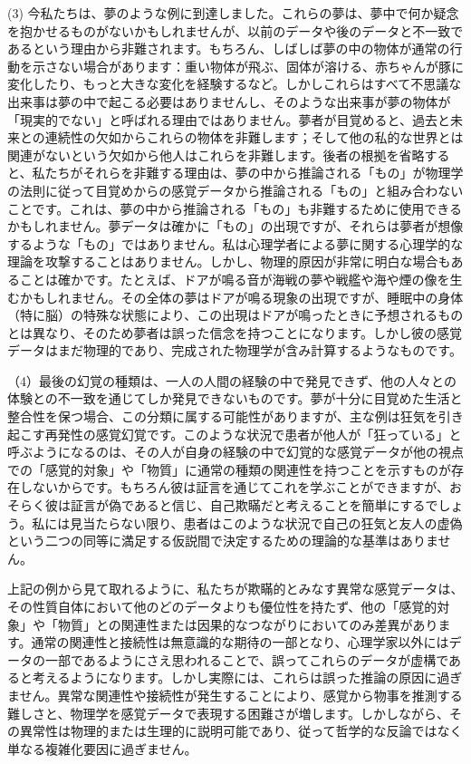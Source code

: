 \documentclass[a4paper,11pt,openany]{ltjsbook}
\begin{document}
(3) 今私たちは、夢のような例に到達しました。これらの夢は、夢中で何か疑念を抱かせるものがないかもしれませんが、以前のデータや後のデータと不一致であるという理由から非難されます。もちろん、しばしば夢の中の物体が通常の行動を示さない場合があります：重い物体が飛ぶ、固体が溶ける、赤ちゃんが豚に変化したり、もっと大きな変化を経験するなど。しかしこれらはすべて不思議な出来事は夢の中で起こる必要はありませんし、そのような出来事が夢の物体が「現実的でない」と呼ばれる理由ではありません。夢者が目覚めると、過去と未来との連続性の欠如からこれらの物体を非難します；そして他の私的な世界とは関連がないという欠如から他人はこれらを非難します。後者の根拠を省略すると、私たちがそれらを非難する理由は、夢の中から推論される「もの」が物理学の法則に従って目覚めからの感覚データから推論される「もの」と組み合わないことです。これは、夢の中から推論される「もの」も非難するために使用できるかもしれません。夢データは確かに「もの」の出現ですが、それらは夢者が想像するような「もの」ではありません。私は心理学者による夢に関する心理学的な理論を攻撃することはありません。しかし、物理的原因が非常に明白な場合もあることは確かです。たとえば、ドアが鳴る音が海戦の夢や戦艦や海や煙の像を生むかもしれません。その全体の夢はドアが鳴る現象の出現ですが、睡眠中の身体（特に脳）の特殊な状態により、この出現はドアが鳴ったときに予想されるものとは異なり、そのため夢者は誤った信念を持つことになります。しかし彼の感覚データはまだ物理的であり、完成された物理学が含み計算するようなものです。


（4）最後の幻覚の種類は、一人の人間の経験の中で発見できず、他の人々との体験との不一致を通じてしか発見できないものです。夢が十分に目覚めた生活と整合性を保つ場合、この分類に属する可能性がありますが、主な例は狂気を引き起こす再発性の感覚幻覚です。このような状況で患者が他人が「狂っている」と呼ぶようになるのは、その人が自身の経験の中で幻覚的な感覚データが他の視点での「感覚的対象」や「物質」に通常の種類の関連性を持つことを示すものが存在しないからです。もちろん彼は証言を通じてこれを学ぶことができますが、おそらく彼は証言が偽であると信じ、自己欺瞞だと考えることを簡単にするでしょう。私には見当たらない限り、患者はこのような状況で自己の狂気と友人の虚偽という二つの同等に満足する仮説間で決定するための理論的な基準はありません。

上記の例から見て取れるように、私たちが欺瞞的とみなす異常な感覚データは、その性質自体において他のどのデータよりも優位性を持たず、他の「感覚的対象」や「物質」との関連性または因果的なつながりにおいてのみ差異があります。通常の関連性と接続性は無意識的な期待の一部となり、心理学家以外にはデータの一部であるようにさえ思われることで、誤ってこれらのデータが虚構であると考えるようになります。しかし実際には、これらは誤った推論の原因に過ぎません。異常な関連性や接続性が発生することにより、感覚から物事を推測する難しさと、物理学を感覚データで表現する困難さが増します。しかしながら、その異常性は物理的または生理的に説明可能であり、従って哲学的な反論ではなく単なる複雑化要因に過ぎません。
\end{document}
